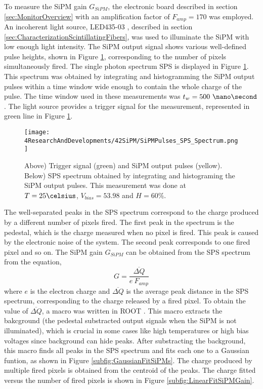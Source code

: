 To measure the SiPM gain $G_{SiPM}$, the electronic board described in section \ref{sec:MonitorOverview} with an amplification factor of $F_{amp}=170$ was employed. An incoherent light source, LED435-03 \cite{LEDRLT}, described in section \ref{sec:CharacterizationScintillatingFibers}, was used to illuminate the SiPM with low enough light intensity. The SiPM output signal shows various well-defined pulse heights, shown in Figure \ref{fig:OutputPulses_SPSspectrum}, corresponding to the number of pixels simultaneously fired. The single photon spectrum SPS is displayed in Figure \ref{fig:OutputPulses_SPSspectrum}. This spectrum was obtained by integrating and histogramming the SiPM output pulses within a time window wide enough to contain the whole charge of the pulse. The time window used in these measurements was $t_w= 500~\nano\second$. The light source provides a trigger signal for the measurement, represented in green line in Figure \ref{fig:OutputPulses_SPSspectrum}.
\begin{figure}[hbtp]
\centering
\texttt{[image: 4ResearchAndDevelopments/42SiPM/SiPMPulses\_SPS\_Spectrum.png]}
\caption{Above) Trigger signal (green) and SiPM output pulses (yellow). Below) SPS spectrum obtained by integrating and histograming the SiPM output pulses. This measurement was done at $T=25\celsius$, $V_{bias}=53.98$ and $H=60\%$. \label{fig:OutputPulses_SPSspectrum}}
\end{figure}
The well-separated peaks in the SPS spectrum correspond to the charge produced by a different number of pixels fired. The first peak in the spectrum is the pedestal, which is the charge measured when no pixel is fired. This peak is caused by the electronic noise of the system. The second peak corresponds to one fired pixel and so on. The SiPM gain $G_{SiPM}$ can be obtained from the SPS spectrum from the equation,
\begin{equation}
G=\frac{\overline{\Delta Q}}{e \: F_{amp}}
\label{SiPMGain}
\end{equation}
where $e$ is the electron charge and $\overline{\Delta Q}$ is the average peak distance in the SPS spectrum, corresponding to the charge released by a fired pixel. To obtain the value of $\overline{\Delta Q}$, a macro was written in ROOT \cite{ROOTWebPage}. This macro extracts the bakcground (the pedestal substracted output signals when the SiPM is not illuminated), which is crucial in some cases like high temperatures or high bias voltages since background can hide peaks. After substracting the background, this macro finds all peaks in the SPS spectrum and fits each one to a Gaussian funtion, as shown in Figure \ref{subfig:GaussianFitSiPMs}. The charge produced by multiple fired pixels is obtained from the centroid of the peaks. The charge fitted versus the number of fired pixels is shown in Figure \ref{subfig:LinearFitSiPMGain}.

